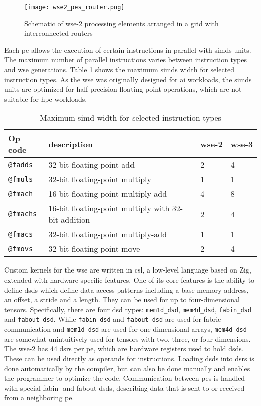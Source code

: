 \begin{figure}[h]
    \centering
    \texttt{[image: wse2\_pes\_router.png]}
    \caption{Schematic of \ac{wse}-2 processing elements arranged in a grid with interconnected routers \cite{lie2023cerebras}}
    \label{fig:wse2_pes_router}
\end{figure}

Each \ac{pe} allows the execution of certain instructions in parallel with \acp{simd} units. The maximum number of parallel instructions varies between instruction types and \ac{wse} generations. Table \ref{tab:simd_operations} shows the maximum \acp{simd} width for selected instruction types. As the \ac{wse} was originally designed for \ac{ai} workloads, the \acp{simd} units are optimized for half-precision floating-point operations, which are not suitable for \ac{hpc} workloads. 

\begin{table}[h]
    \centering
    \caption{Maximum \ac{simd} width for selected instruction types}
    \label{tab:simd_operations}
    \begin{tabular}{@{}llll@{}}
        \toprule
        Op code & description & \ac{wse}-2 & \ac{wse}-3 \\
        \midrule
        \texttt{@fadds} & 32-bit floating-point add & 2 & 4 \\
        \texttt{@fmuls} & 32-bit floating-point multiply & 1 & 1 \\
        \texttt{@fmach} & 16-bit floating-point multiply-add & 4 & 8 \\
        \texttt{@fmachs} & 16-bit floating-point multiply with 32-bit addition & 2 & 4 \\
        \texttt{@fmacs} & 32-bit floating-point multiply-add & 1 & 1 \\
        \texttt{@fmovs} & 32-bit floating-point move & 2 & 4 \\
        \bottomrule
    \end{tabular}
\end{table}

Custom kernels for the \ac{wse} are written in \ac{csl}, a low-level language based on Zig, extended with hardware-specific features.
One of its core features is the ability to define \acp{dsd} which define data access patterns including a base memory address, an offset, a stride and a length. They can be used for up to four-dimensional tensors. Specifically, there are four \ac{dsd} types: \texttt{mem1d\_dsd}, \texttt{mem4d\_dsd}, \texttt{fabin\_dsd} and \texttt{fabout\_dsd}. While \texttt{fabin\_dsd} and \texttt{fabout\_dsd} are used for fabric communication and \texttt{mem1d\_dsd} are used for one-dimensional arrays, \texttt{mem4d\_dsd} are somewhat unintuitively used for tensors with two, three, or four dimensions. The \ac{wse}-2 has 44 \acp{dsr} per \ac{pe}, which are hardware registers used to hold \acp{dsd}. These can be used directly as operands for instructions. Loading \acp{dsd} into \acp{dsr} is done automatically by the compiler, but can also be done manually and enables the programmer to optimize the code. Communication between \acp{pe} is handled with special fabin- and fabout-\acp{dsd}, describing data that is sent to or received from a neighboring \ac{pe}.

